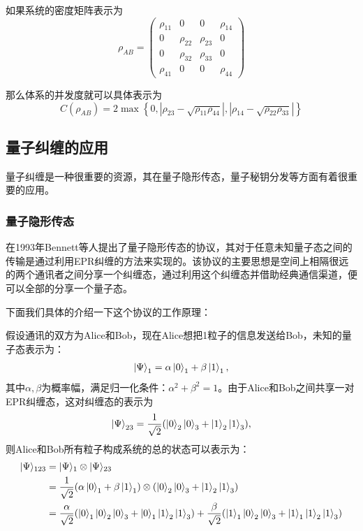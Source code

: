 如果系统的密度矩阵表示为
\begin{equation}\label{eq2249}
\rho_{A B}=\left( \begin{array}{cccc}{\rho_{11}} & {0} & {0} & {\rho_{14}} \\ {0} & {\rho_{22}} & {\rho_{23}} & {0} \\ {0} & {\rho_{32}} & {\rho_{33}} & {0} \\ {\rho_{41}} & {0} & {0} & {\rho_{44}}\end{array}\right)
\end{equation}

那么体系的并发度就可以具体表示为
\begin{equation}\label{eq2250}
C\left(\rho_{A B}\right)=2 \max \left\{0,\left|\rho_{23}-\sqrt{\rho_{11} \rho_{44}}\right|,\left|\rho_{14}-\sqrt{\rho_{22} \rho_{33}}\right|\right\}
\end{equation}

\subsection{量子纠缠的应用}
量子纠缠是一种很重要的资源，其在量子隐形传态，量子秘钥分发等方面有着很重要的应用。

\subsubsection{量子隐形传态}
在1993年Bennett等人\cite{bennett1993teleporting}提出了量子隐形传态的协议，其对于任意未知量子态之间的传输是通过利用EPR纠缠的方法来实现的。该协议的主要思想是空间上相隔很远的两个通讯者之间分享一个纠缠态，通过利用这个纠缠态并借助经典通信渠道，便可以全部的分享一个量子态。

下面我们具体的介绍一下这个协议的工作原理：

假设通讯的双方为Alice和Bob，现在Alice想把1粒子的信息发送给Bob，未知的量子态表示为：
\begin{align}\label{eq2251}
\ket{\Psi}_1=\alpha\ket{0}_1+\beta\ket{1}_1,
\end{align}
其中$\alpha,\beta$为概率幅，满足归一化条件：$\alpha^2+\beta^2=1$。由于Alice和Bob之间共享一对EPR纠缠态，这对纠缠态的表示为
\begin{align}\label{eq2252}
\ket{\Psi}_{23}=\frac{1}{\sqrt{2}}(\ket{0}_2\ket{0}_3+\ket{1}_2\ket{1}_3),
\end{align}
则Alice和Bob所有粒子构成系统的总的状态可以表示为：
\begin{equation}
\begin{aligned} | \Psi \rangle_{123} &=| \Psi \rangle_{1} \otimes | \Psi \rangle_{23} \\ 
&=\frac{1}{\sqrt{2}}(\alpha\ket{0}_1+\beta \ket{1}_1 ) \otimes( \ket{0}_2\ket{0}_3+\ket{1}_2\ket{1}_3 ) \\
 &=\frac{\alpha}{\sqrt{2}}( \ket{0}_1\ket{0}_2\ket{0}_3+\ket{0}_1\ket{1}_2\ket{1}_3)+\frac{\beta}{\sqrt{2}}( \ket{1}_1\ket{0}_2\ket{0}_3+\ket{1}_1\ket{1}_2\ket{1}_3 ) \end{aligned}
\end{equation}

